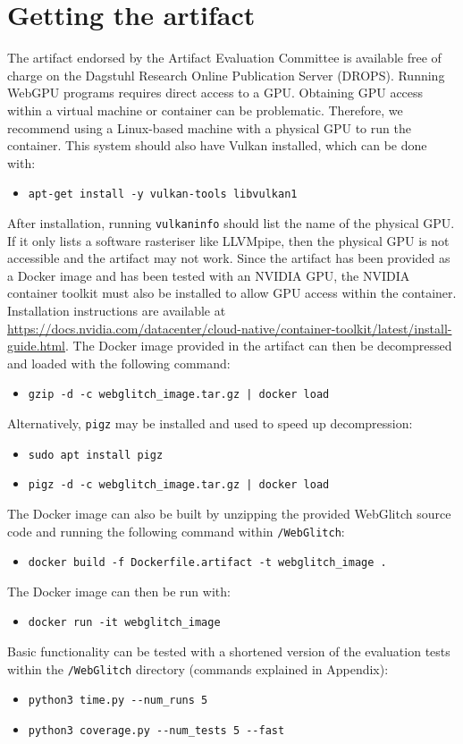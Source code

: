 \documentclass[a4paper,UKenglish]{darts-v2021}
\newenvironment{getting}{\section{Getting the artifact} The artifact 
endorsed by the Artifact Evaluation Committee is available free of 
charge on the Dagstuhl Research Online Publication Server (DROPS).}{}
\begin{document}
\begin{getting}
Running WebGPU programs requires direct access to a GPU. 
Obtaining GPU access within a virtual machine or container can be problematic. 
Therefore, we recommend using a Linux-based machine with a physical GPU to run the container.
This system should also have Vulkan installed, which can be done with:
\begin{itemize}
    \item \texttt{apt-get install -y vulkan-tools libvulkan1}
\end{itemize}
After installation, running \texttt{vulkaninfo} should list the name of the physical GPU. 
If it only lists a software rasteriser like LLVMpipe, then the physical GPU is not accessible and the artifact may not work.
Since the artifact has been provided as a Docker image and has been tested with an NVIDIA GPU, the NVIDIA container toolkit must also be installed to allow GPU access within the container. Installation instructions are available at \url{https://docs.nvidia.com/datacenter/cloud-native/container-toolkit/latest/install-guide.html}.
The Docker image provided in the artifact can then be decompressed and loaded with the following command:
\begin{itemize}
    \item \texttt{gzip -d -c webglitch\_image.tar.gz | docker load}
\end{itemize}
Alternatively, \texttt{pigz} may be installed and used to speed up decompression:
\begin{itemize}
    \item \texttt{sudo apt install pigz}
    \item \texttt{pigz -d -c webglitch\_image.tar.gz | docker load}
\end{itemize}
The Docker image can also be built by unzipping the provided WebGlitch source code and running the following command within \texttt{/WebGlitch}:
\begin{itemize}
    \item \texttt{docker build -f Dockerfile.artifact -t webglitch\_image .}
\end{itemize}
The Docker image can then be run with:
\begin{itemize}
    \item \texttt{docker run -it webglitch\_image}
\end{itemize}
Basic functionality can be tested with a shortened version of the evaluation tests within the \texttt{/WebGlitch} directory (commands explained in Appendix):
\begin{itemize}
    \item \texttt{python3 time.py -{}-num\_runs 5}
    \item \texttt{python3 coverage.py -{}-num\_tests 5 -{}-fast}
\end{itemize}
\end{getting}
\end{document}
